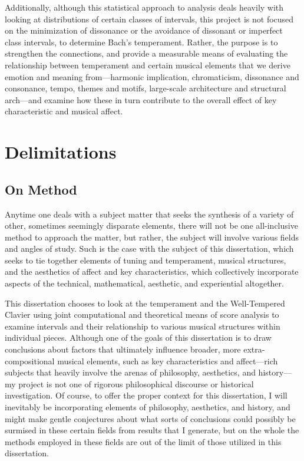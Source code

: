 Additionally, although this statistical approach to analysis deals
heavily with looking at distributions of certain classes of intervals,
this project is not focused on the minimization of dissonance or the
avoidance of dissonant or imperfect class intervals, to determine Bach's
temperament. Rather, the purpose is to strengthen the connections, and
provide a measurable means of evaluating the relationship between
temperament and certain musical elements that we derive emotion and
meaning from---harmonic implication, chromaticism, dissonance and
consonance, tempo, themes and motifs, large-scale architecture and
structural arch---and examine how these in turn contribute to the
overall effect of key characteristic and musical affect.

    \section{Delimitations}\label{delimitations}

\subsection{On Method}\label{on-method}

Anytime one deals with a subject matter that seeks the synthesis of a
variety of other, sometimes seemingly disparate elements, there will not
be one all-inclusive method to approach the matter, but rather, the
subject will involve various fields and angles of study. Such is the
case with the subject of this dissertation, which seeks to tie together
elements of tuning and temperament, musical structures, and the
aesthetics of affect and key characteristics, which collectively
incorporate aspects of the technical, mathematical, aesthetic, and
experiential altogether.

This dissertation chooses to look at the temperament and the
Well-Tempered Clavier using joint computational and theoretical means of
score analysis to examine intervals and their relationship to various
musical structures within individual pieces. Although one of the goals
of this dissertation is to draw conclusions about factors that
ultimately influence broader, more extra-compositional musical elements,
such as key characteristics and affect---rich subjects that heavily
involve the arenas of philosophy, aesthetics, and history---my project
is not one of rigorous philosophical discourse or historical
investigation. Of course, to offer the proper context for this
dissertation, I will inevitably be incorporating elements of philosophy,
aesthetics, and history, and might make gentle conjectures about what
sorts of conclusions could possibly be surmised in these certain fields
from results that I generate, but on the whole the methods employed in
these fields are out of the limit of those utilized in this
dissertation.

